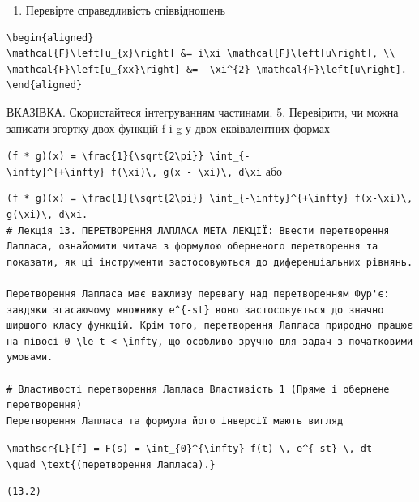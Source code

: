 \documentclass[
  ukrainian,
]{article}
\providecommand{\tightlist}{%
  \setlength{\itemsep}{0pt}\setlength{\parskip}{0pt}}
\begin{document}
\begin{enumerate}
\def\labelenumi{\arabic{enumi}.}
\setcounter{enumi}{3}
\tightlist
\item
  Перевірте справедливість співвідношень
\end{enumerate}

\begin{verbatim}
\begin{aligned}
\mathcal{F}\left[u_{x}\right] &= i\xi \mathcal{F}\left[u\right], \\
\mathcal{F}\left[u_{xx}\right] &= -\xi^{2} \mathcal{F}\left[u\right].
\end{aligned}
\end{verbatim}

ВКАЗІВКА. Скористайтеся інтегруванням частинами. 5. Перевірити, чи можна
записати згортку двох функцій f і g у двох еквівалентних формах

\texttt{(f\ *\ g)(x)\ =\ \textbackslash{}frac\{1\}\{\textbackslash{}sqrt\{2\textbackslash{}pi\}\}\ \textbackslash{}int\_\{-\textbackslash{}infty\}\^{}\{+\textbackslash{}infty\}\ f(\textbackslash{}xi)\textbackslash{},\ g(x\ -\ \textbackslash{}xi)\textbackslash{},\ d\textbackslash{}xi}
або

\begin{verbatim}
(f * g)(x) = \frac{1}{\sqrt{2\pi}} \int_{-\infty}^{+\infty} f(x-\xi)\, g(\xi)\, d\xi.
# Лекція 13. ПЕРЕТВОРЕННЯ ЛАПЛАСА МЕТА ЛЕКЦІЇ: Ввести перетворення Лапласа, ознайомити читача з формулою оберненого перетворення та показати, як ці інструменти застосовуються до диференціальних рівнянь.

Перетворення Лапласа має важливу перевагу над перетворенням Фур'є: завдяки згасаючому множнику e^{-st} воно застосовується до значно ширшого класу функцій. Крім того, перетворення Лапласа природно працює на півосі 0 \le t < \infty, що особливо зручно для задач з початковими умовами.

# Властивості перетворення Лапласа Властивість 1 (Пряме і обернене перетворення)
Перетворення Лапласа та формула його інверсії мають вигляд
\end{verbatim}

\texttt{\textbackslash{}mathscr\{L\}{[}f{]}\ =\ F(s)\ =\ \textbackslash{}int\_\{0\}\^{}\{\textbackslash{}infty\}\ f(t)\ \textbackslash{},\ e\^{}\{-st\}\ \textbackslash{},\ dt}
\texttt{\textbackslash{}quad\ \textbackslash{}text\{(перетворення\ Лапласа).\}}

\begin{verbatim}
(13.2)
\end{verbatim}
\end{document}
